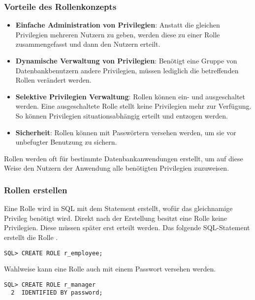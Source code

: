         \subsubsection{Vorteile des Rollenkonzepts}
          \begin{itemize}
            \item \textbf{Einfache Administration von Privilegien}: Anstatt die gleichen Privilegien mehreren Nutzern zu geben, werden diese zu einer Rolle zusammengefasst und dann den Nutzern erteilt.
            \item \textbf{Dynamische Verwaltung von Privilegien}: Benötigt eine Gruppe von Datenbankbenutzern andere Privilegien, müssen lediglich die betreffenden Rollen verän\-dert werden.
            \item \textbf{Selektive Privilegien Verwaltung}: Rollen können ein- und ausgeschaltet werden. Eine ausgeschaltete Rolle stellt keine Privilegien mehr zur Verfügung. So können Privilegien situationsabhängig erteilt und entzogen werden.
            \item \textbf{Sicherheit}: Rollen können mit Passwörtern versehen werden, um sie vor unbefugter Benutzung zu sichern.
          \end{itemize}
          Rollen werden oft für bestimmte Datenbankanwendungen erstellt, um
          auf diese Weise den Nutzern der Anwendung alle benötigten
          Privilegien zuzuweisen.
\clearpage
          \vspace{\baselineskip}
        \subsubsection{Rollen erstellen}
          Eine Rolle wird in SQL mit dem Statement  erstellt, wofür das gleichnamige Privileg  benötigt wird. Direkt nach der Erstellung besitzt eine Rolle keine Privilegien. Diese müssen später erst erteilt werden. Das folgende SQL-Statement erstellt die Rolle .
          \begin{lstlisting}[caption={Erstellen einer Rolle},label=admin247,language=oracle_sql]
SQL> CREATE ROLE r_employee;
          \end{lstlisting}
          Wahlweise kann eine Rolle auch mit einem Passwort versehen werden.
          \begin{lstlisting}[caption={Erstellen einer Rolle mit Passwort},label=admin248,language=oracle_sql]
SQL> CREATE ROLE r_manager
  2  IDENTIFIED BY password;
          \end{lstlisting}
